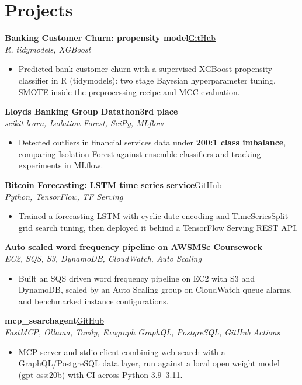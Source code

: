 \documentclass[a4paper,11pt]{article}
\newcommand{\project}[3]{%
  \textbf{#1}\hfill#3\\
  {\color{muted}\small\textit{#2}}\par}
\newcommand{\gh}[1]{\href{#1}{\small GitHub}}
\newcommand{\badge}[1]{{\color{navy}\small\textbf{#1}}}
\newcommand{\gap}{\vspace{5pt}}
\newcommand{\num}[1]{\textbf{#1}}   %
\begin{document}
\section{Projects}
\project{Banking Customer Churn: propensity model}{R, tidymodels, XGBoost}{\gh{https://github.com/Thiruvel-AP/Banking-Customer-Churn-Prediction}}
\begin{itemize}
  \item Predicted bank customer churn with a supervised XGBoost propensity classifier in R (tidymodels): two stage Bayesian hyperparameter tuning, SMOTE inside the preprocessing recipe and MCC evaluation.
\end{itemize}
\gap
{}
\project{Lloyd\textquotesingle{}s Banking Group Datathon}{scikit-learn, Isolation Forest, SciPy, MLflow}{\badge{3rd place}}
\begin{itemize}
  \item Detected outliers in financial services data under \num{200:1 class imbalance}, comparing Isolation Forest against ensemble classifiers and tracking experiments in MLflow.
\end{itemize}
\gap
{}
\project{Bitcoin Forecasting: LSTM time series service}{Python, TensorFlow, TF Serving}{\gh{https://github.com/Thiruvel-AP/BitcoinForecasting}}
\begin{itemize}
  \item Trained a forecasting LSTM with cyclic date encoding and TimeSeriesSplit grid search tuning, then deployed it behind a TensorFlow Serving REST API.
\end{itemize}
\gap
{}
\project{Auto scaled word frequency pipeline on AWS}{EC2, SQS, S3, DynamoDB, CloudWatch, Auto Scaling}{\badge{MSc Coursework}}
\begin{itemize}
  \item Built an SQS driven word frequency pipeline on EC2 with S3 and DynamoDB, scaled by an Auto Scaling group on CloudWatch queue alarms, and benchmarked instance configurations.
\end{itemize}
\gap
{}
\project{mcp\_searchagent}{FastMCP, Ollama, Tavily, Exograph GraphQL, PostgreSQL, GitHub Actions}{\gh{https://github.com/Thiruvel-AP/mcp_searchagent}}
\begin{itemize}
  \item MCP server and stdio client combining web search with a GraphQL/PostgreSQL data layer, run against a local open weight model (gpt-oss:20b) with CI across Python 3.9–3.11.
\end{itemize}
\end{document}
